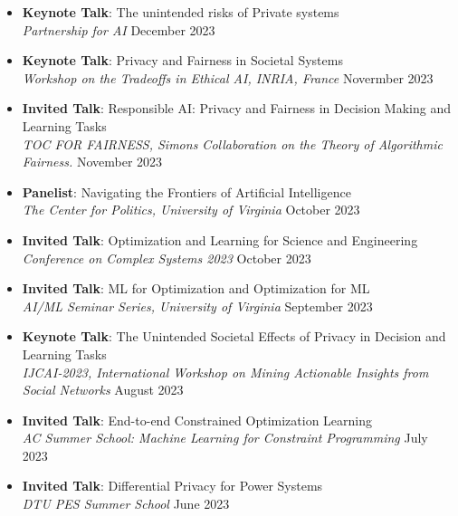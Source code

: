 

\begin{itemize}
  \item {\bf Keynote Talk}: The unintended risks of Private systems\\
  {\em Partnership for AI}
  \hfill{December 2023}
  
  \item {\bf Keynote Talk}: {Privacy and Fairness in Societal Systems}\\
  {\em  Workshop on the Tradeoffs in Ethical AI, INRIA, France}
  \hfill{Novermber 2023}

  \item {\bf Invited Talk}: {Responsible AI: Privacy and Fairness in Decision Making and Learning Tasks}\\
  {\em  TOC FOR FAIRNESS, Simons Collaboration on the Theory of Algorithmic Fairness.}
  \hfill{November 2023}

  \item {\bf Panelist}: {Navigating the Frontiers of Artificial Intelligence}\\
  {\em  The Center for Politics, University of Virginia}
  \hfill{October 2023}

  \item {\bf Invited Talk}: {Optimization and Learning for Science and Engineering}\\
  {\em  Conference on Complex Systems 2023}
  \hfill{October 2023}

  \item {\bf Invited Talk}: {ML for Optimization and Optimization for ML}\\
  {\em  AI/ML Seminar Series, University of Virginia}
  \hfill{September 2023}

  \item {\bf Keynote Talk}: {The Unintended Societal Effects of Privacy in Decision and Learning Tasks}\\
  {\em  IJCAI-2023, International Workshop on Mining Actionable Insights from Social Networks}
  \hfill{August 2023}

  \item {\bf Invited Talk}: {End-to-end Constrained Optimization Learning}\\
  {\em  AC Summer School: Machine Learning for Constraint Programming}
  \hfill{July 2023}

  \item {\bf Invited Talk}: {Differential Privacy for Power Systems}\\
  {\em  DTU PES Summer School}
  \hfill{June 2023}


\end{itemize}
